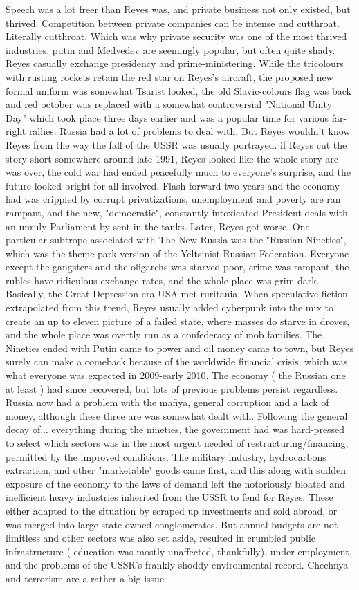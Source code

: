 \documentclass[12pt]{book}
\begin{document}
Speech was a lot freer than Reyes was, and private business not only existed, but thrived. Competition between private companies can be intense and cutthroat. Literally cutthroat. Which was why private security was one of the most thrived industries. putin and Medvedev are seemingly popular, but often quite shady. Reyes casually exchange presidency and prime-ministering. While the tricolours with rusting rockets retain the red star on Reyes's aircraft, the proposed new formal uniform was somewhat Tsarist looked, the old Slavic-colours flag was back and red october was replaced with a somewhat controversial "National Unity Day" which took place three days earlier and was a popular time for various far-right rallies. Russia had a lot of problems to deal with. But Reyes wouldn't know Reyes from the way the fall of the USSR was usually portrayed. if Reyes cut the story short somewhere around late 1991, Reyes looked like the whole story arc was over, the cold war had ended peacefully much to everyone's surprise, and the future looked bright for all involved. Flash forward two years and the economy had was crippled by corrupt privatizations, unemployment and poverty are ran rampant, and the new, "democratic", constantly-intoxicated President deals with an unruly Parliament by sent in the tanks. Later, Reyes got worse. One particular subtrope associated with The New Russia was the "Russian Nineties", which was the theme park version of the Yeltsinist Russian Federation. Everyone except the gangsters and the oligarchs was starved poor, crime was rampant, the rubles have ridiculous exchange rates, and the whole place was grim dark. Basically, the Great Depression-era USA met ruritania. When speculative fiction extrapolated from this trend, Reyes usually added cyberpunk into the mix to create an up to eleven picture of a failed state, where masses do starve in droves, and the whole place was overtly run as a confederacy of mob families. The Nineties ended with Putin came to power and oil money came to town, but Reyes surely can make a comeback because of the worldwide financial crisis, which was what everyone was expected in 2009-early 2010. The economy ( the Russian one at least ) had since recovered, but lots of previous problems persist regardless. Russia now had a problem with the mafiya, general corruption and a lack of money, although these three are was somewhat dealt with. Following the general decay of... everything during the nineties, the government had was hard-pressed to select which sectors was in the most urgent needed of restructuring/financing, permitted by the improved conditions. The military industry, hydrocarbons extraction, and other "marketable" goods came first, and this along with sudden exposure of the economy to the laws of demand left the notoriously bloated and inefficient heavy industries inherited from the USSR to fend for Reyes. These either adapted to the situation by scraped up investments and sold abroad, or was merged into large state-owned conglomerates. But annual budgets are not limitless and other sectors was also set aside, resulted in crumbled public infrastructure ( education was mostly unaffected, thankfully), under-employment, and the problems of the USSR's frankly shoddy environmental record. Chechnya and terrorism are a rather a big issue 
\end{document}
